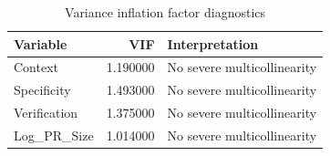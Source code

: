 \begin{table}
\caption{Variance inflation factor diagnostics}
\label{tab:vif}
\begin{tabular}{lrl}
\toprule
Variable & VIF & Interpretation \\
\midrule
Context & 1.190000 & No severe multicollinearity \\
Specificity & 1.493000 & No severe multicollinearity \\
Verification & 1.375000 & No severe multicollinearity \\
Log\_PR\_Size & 1.014000 & No severe multicollinearity \\
\bottomrule
\end{tabular}
\end{table}
